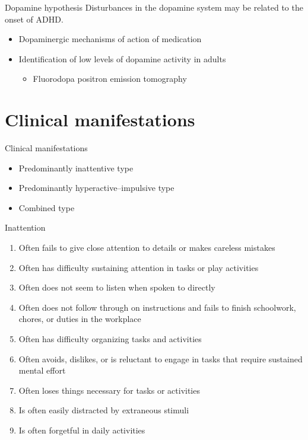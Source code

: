 \documentclass{beamer}
\begin{document}
\begin{frame}{Dopamine hypothesis}
Disturbances in the dopamine system may be related to the onset of ADHD.

\begin{itemize}
    \item Dopaminergic mechanisms of action of medication
    \item Identification of low levels of dopamine activity in adults
    \begin{itemize}
        \item Fluorodopa positron emission tomography
    \end{itemize}
\end{itemize}
\end{frame}

\section{Clinical manifestations}
\begin{frame}{Clinical manifestations}
\begin{itemize}
    \item Predominantly inattentive type
    \item Predominantly hyperactive--impulsive type
    \item Combined type
\end{itemize}
\end{frame}

\begin{frame}{Inattention}
\begin{enumerate}
    \item Often fails to give close attention to details or makes careless mistakes
    \item Often has difficulty sustaining attention in tasks or play activities
    \item Often does not seem to listen when spoken to directly
    \item Often does not follow through on instructions and fails to finish schoolwork, chores, or duties in the workplace
    \item Often has difficulty organizing tasks and activities
    \item Often avoids, dislikes, or is reluctant to engage in tasks that require sustained mental effort
    \item Often loses things necessary for tasks or activities
    \item Is often easily distracted by extraneous stimuli
    \item Is often forgetful in daily activities
\end{enumerate}
\end{frame}
\end{document}
